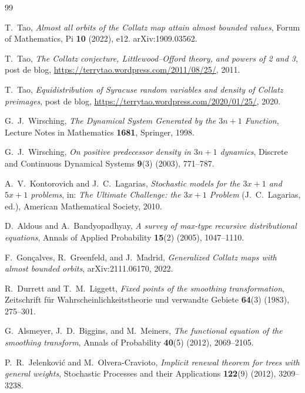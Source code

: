\documentclass[11pt]{article}
\theoremstyle{definition}
\theoremstyle{remark}
\begin{document}
\begin{thebibliography}{99}

 T.\ Tao, \emph{Almost all orbits of the Collatz map
  attain almost bounded values}, Forum of Mathematics, Pi \textbf{10}
  (2022), e12. arXiv:1909.03562.

 T.\ Tao, \emph{The Collatz conjecture, Littlewood--Offord
  theory, and powers of 2 and 3}, post de blog,
  \url{https://terrytao.wordpress.com/2011/08/25/}, 2011.

 T.\ Tao, \emph{Equidistribution of Syracuse random
  variables and density of Collatz preimages}, post de blog,
  \url{https://terrytao.wordpress.com/2020/01/25/}, 2020.

 G.\ J.\ Wirsching, \emph{The Dynamical System
  Generated by the $3n+1$ Function}, Lecture Notes in Mathematics
  \textbf{1681}, Springer, 1998.

 G.\ J.\ Wirsching, \emph{On positive predecessor
  density in $3n+1$ dynamics}, Discrete and Continuous Dynamical
  Systems \textbf{9}(3) (2003), 771--787.

 A.\ V.\ Kontorovich and J.\ C.\
  Lagarias, \emph{Stochastic models for the $3x+1$ and $5x+1$
  problems}, in: \emph{The Ultimate Challenge: the $3x+1$ Problem}
  (J.\ C.\ Lagarias, ed.), American Mathematical Society, 2010.

 D.\ Aldous and A.\ Bandyopadhyay,
  \emph{A survey of max-type recursive distributional equations},
  Annals of Applied Probability \textbf{15}(2) (2005), 1047--1110.

 F.\ Gon\c{c}alves, R.\
  Greenfeld, and J.\ Madrid, \emph{Generalized Collatz maps with almost
  bounded orbits}, arXiv:2111.06170, 2022.

 R.\ Durrett and T.\ M.\ Liggett,
  \emph{Fixed points of the smoothing transformation}, Zeitschrift für
  Wahrscheinlichkeitstheorie und verwandte Gebiete \textbf{64}(3)
  (1983), 275--301.

 G.\ Alsmeyer, J.\ D.\ Biggins, and
  M.\ Meiners, \emph{The functional equation of the smoothing
  transform}, Annals of Probability \textbf{40}(5) (2012), 2069--2105.

\bibitem{JelenkovicOlveraCravioto2012} P.\ R.\ Jelenkovi\'c and
  M.\ Olvera-Cravioto, \emph{Implicit renewal theorem for trees with
  general weights}, Stochastic Processes and their Applications
  \textbf{122}(9) (2012), 3209--3238.


\end{thebibliography}
\end{document}
